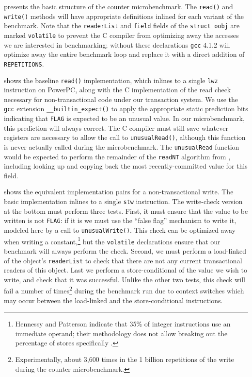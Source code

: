  presents the basic structure of the counter
microbenchmark. The \texttt{read()} and \texttt{write()} methods will
have appropriate definitions inlined for each variant of the
benchmark.  Note that the \texttt{readerList} and \texttt{field}
fields of the \texttt{struct oobj} are marked \texttt{volatile} to
prevent the C compiler from optimizing away the accesses we are
interested in benchmarking; without these declarations \texttt{gcc}
4.1.2 will optimize away the entire benchmark loop and replace it with
a direct addition of \texttt{REPETITIONS}.

 shows the baseline \texttt{read()}
implementation, which inlines to a single \texttt{lwz} instruction on
PowerPC, along with the C implementation of the read check necessary
for non-transactional code under our transaction system.  We use the
\texttt{gcc} extension \texttt{\_\_builtin\_expect()} to apply the
appropriate static prediction bits indicating that \texttt{FLAG} is
expected to be an unusual value.  In our microbenchmark, this
prediction will always correct.  The C compiler must still save
whatever registers are necessary to allow the call to
\texttt{unusualRead()}, although this function is never actually called
during the microbenchmark.  The \texttt{unusualRead} function would be
expected to perform the remainder of the \texttt{readNT} algorithm
from , including looking up and copying back the most
recently-committed value for this field.

 shows the equivalent implementation pairs for a
non-transactional write.  The basic implementation inlines to a single
\texttt{stw} instruction.  The write-check version at the bottom must
perform three tests.  First, it must ensure that the value to be
written is not \texttt{FLAG}: if it is we must use the ``false flag''
mechanism to write it, modeled here by a call to
\texttt{unusualWrite()}.  This check can be optimized away when
writing a constant,\footnote{Hennessy and Patterson indicate that 35\%
  of integer instructions use an immediate operand; their methodology does not
  allow breaking out the percentage of stores specifically
  \cite[pp. 78]{HennessyPa96}.}
 but the \texttt{volatile} declarations ensure that
our benchmark will always perform the check.  Second, we must perform
a load-linked of the object's \texttt{readerList} to check that there
are not any current transactional readers of this object.  Last we
perform a store-conditional of the value we wish to write, and check
that it was successful.  Unlike the other two tests, this check will
fail a number of times\footnote{Experimentally, about 3,600 times in
  the 1 billion repetitions of the write during the counter microbenchmark.}
 during the benchmark run due to context switches
which may occur between the load-linked and the store-conditional
instructions.

